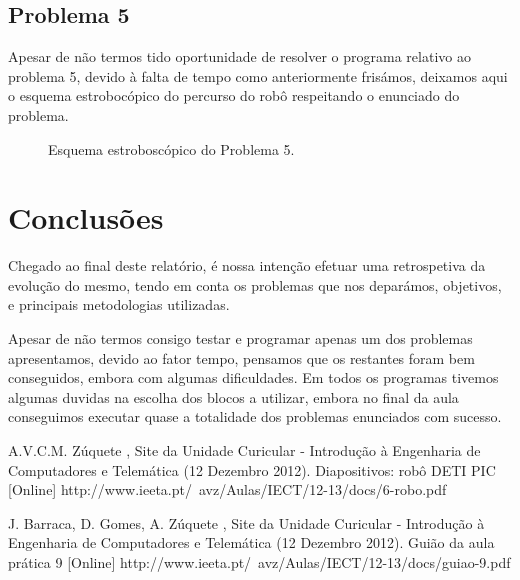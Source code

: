 \documentclass[a4paper, 12pt, onecolumn, oneside]{report}
\begin{document}
\subsection{Problema 5}


Apesar de não termos tido oportunidade de resolver o programa relativo ao problema 5, devido à falta de tempo como anteriormente frisámos, deixamos aqui o esquema estrobocópico do percurso do robô respeitando o enunciado do problema.  


\begin{figure}[H]
\caption{Esquema estroboscópico do Problema 5.}
\label{fig:speciation}
\end{figure}




 \newpage

\section{Conclusões}

Chegado ao final deste relatório, é nossa intenção efetuar uma retrospetiva da evolução do mesmo, tendo em conta os problemas que nos deparámos, objetivos, e principais metodologias utilizadas.

Apesar de não termos consigo testar e programar apenas um dos problemas apresentamos, devido ao fator tempo, pensamos que os restantes foram bem conseguidos, embora com algumas dificuldades. Em todos os programas tivemos algumas duvidas na escolha dos blocos a utilizar, embora no final da aula conseguimos executar quase a totalidade dos problemas enunciados com sucesso. 








\begin{thebibliography}{99} 

A.V.C.M. Zúquete , Site da Unidade Curicular - Introdução à Engenharia de Computadores e Telemática (12 Dezembro 2012).
\newblock Diapositivos: robô DETI PIC [Online]
 http://www.ieeta.pt/~avz/Aulas/IECT/12-13/docs/6-robo.pdf 

J. Barraca, D. Gomes, A. Zúquete , Site da Unidade Curicular - Introdução à  Engenharia de Computadores e Telemática (12 Dezembro 2012).
\newblock Guião da aula prática 9 [Online]
 http://www.ieeta.pt/~avz/Aulas/IECT/12-13/docs/guiao-9.pdf 

 
\end{thebibliography}
\end{document}
